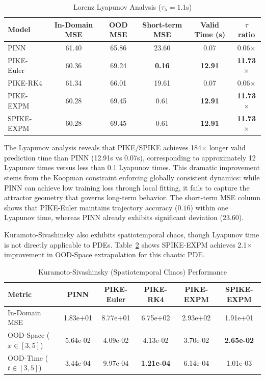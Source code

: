 \documentclass{article}
\theoremstyle{remark}
\begin{document}
\begin{table}[H]
\centering
\caption{Lorenz Lyapunov Analysis ($\tau_\lambda = 1.1$s)}
\label{tab:lyapunov}
\begin{tabular}{lccccc}
\toprule
Model & In-Domain MSE & OOD MSE & Short-term MSE & Valid Time (s) & $\tau$ ratio \\
\midrule
PINN & 61.40 & 65.86 & 23.60 & 0.07 & 0.06$\times$ \\
PIKE-Euler & 60.36 & 69.24 & \textbf{0.16} & \textbf{12.91} & \textbf{11.73$\times$} \\
PIKE-RK4 & 61.34 & 66.01 & 19.61 & 0.07 & 0.06$\times$ \\
PIKE-EXPM & 60.28 & 69.45 & 0.61 & \textbf{12.91} & \textbf{11.73$\times$} \\
SPIKE-EXPM & 60.28 & 69.45 & 0.61 & \textbf{12.91} & \textbf{11.73$\times$} \\
\bottomrule
\end{tabular}
\end{table}

The Lyapunov analysis reveals that PIKE/SPIKE achieves 184$\times$ longer valid prediction time than PINN (12.91s vs 0.07s), corresponding to approximately 12 Lyapunov times versus less than 0.1 Lyapunov times. This dramatic improvement stems from the Koopman constraint enforcing globally consistent dynamics: while PINN can achieve low training loss through local fitting, it fails to capture the attractor geometry that governs long-term behavior. The short-term MSE column shows that PIKE-Euler maintains trajectory accuracy ($0.16$) within one Lyapunov time, whereas PINN already exhibits significant deviation ($23.60$).

Kuramoto-Sivashinsky also exhibits spatiotemporal chaos, though Lyapunov time is not directly applicable to PDEs. Table~\ref{tab:ks_chaos} shows SPIKE-EXPM achieves 2.1$\times$ improvement in OOD-Space extrapolation for this chaotic PDE.

\begin{table}[H]
\centering
\caption{Kuramoto-Sivashinsky (Spatiotemporal Chaos) Performance}
\label{tab:ks_chaos}
\begin{tabular}{lccccc}
\toprule
Metric & PINN & PIKE-Euler & PIKE-RK4 & PIKE-EXPM & SPIKE-EXPM \\
\midrule
In-Domain MSE & 1.83e+01 & 8.77e+01 & 6.75e+02 & 2.93e+02 & 1.91e+01 \\
OOD-Space ($x \in [3,5]$) & 5.64e-02 & 4.09e-02 & 4.13e-02 & 3.70e-02 & \textbf{2.65e-02} \\
OOD-Time ($t \in [3,5]$) & 3.44e-04 & 9.97e-04 & \textbf{1.21e-04} & 6.14e-04 & 1.01e-03 \\
\bottomrule
\end{tabular}
\end{table}
\end{document}
